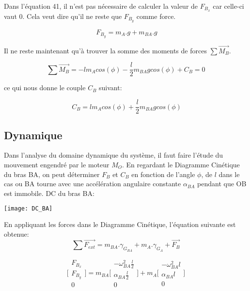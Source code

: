\documentclass{article}
\begin{document}
\noindent Dans l'équation 41, il n'est pas nécessaire de calculer la valeur de $F_{B_x}$ car celle-ci vaut 0. Cela veut dire qu'il ne reste que $F_{B_y}$ comme force.

\begin{equation}
\ F_{B_y} = m_A.g + m_{BA}.g
\end{equation}

\noindent Il ne reste maintenant qu'à trouver la somme des moments de forces $\sum \overrightarrow{M_B}$.

\begin{equation}
\sum \overrightarrow{M_B} = -lm_Acos(\phi) - \frac{l}{2}m_{BA}gcos(\phi) + C_B = 0
\end{equation}

\noindent ce qui nous donne le couple $C_B$ suivant: 

\begin{equation}
\ C_B = lm_Acos(\phi)+ \frac{l}{2}m_{BA}gcos(\phi)
\end{equation}

\subsection{Dynamique}
\noindent
Dans l'analyse du domaine dynamique du système, il faut faire l'étude du mouvement engendré par le moteur $M_O$. En regardant le Diagramme Cinétique du bras BA, on peut déterminer $F_B$ et $C_B$ en fonction de l'angle $\phi$, de $l$ dans le cas ou BA tourne avec une accélération angulaire constante $\alpha_{BA}$ pendant que OB est immobile.
\newline
\newline
\noindent DC du bras BA:
\newline
\begin{center}
\noindent \texttt{[image: DC\_BA]}
\end{center}

\newpage
\noindent En appliquant les forces dans le Diagramme Cinétique, l'équation suivante est obtenue:
\begin{equation}
\sum \overrightarrow{F_{ext}} = m_{BA}.\gamma_{G_{BA}} + m_A.\gamma_{G_A} + \overrightarrow{F_B}
\end{equation}

\begin{equation}
    \Bigg[\begin{array}{cc}
    F_{B_x} \\
    F_{B_y} \\
    0
    \end{array}\Bigg]
    =
    m_{BA}\Bigg[\begin{array}{cc}
    -\omega^2_{BA}\frac{l}{2} \\
    \alpha_{BA}\frac{l}{2} \\
    0
    \end{array}\Bigg]
    +
    m_A\Bigg[\begin{array}{cc}
    -\omega^2_{BA}l \\
    \alpha_{BA}l \\
    0
    \end{array}\Bigg]
\end{equation}
\end{document}
